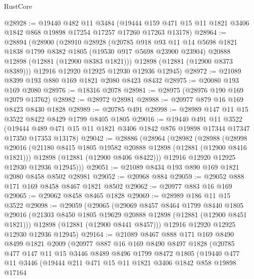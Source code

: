 \begin{lexlean}{RustCore}
\begin{coremodule}
@28928 := @19440
    @482
    @11
    @3484
    (@19444 @159 @471 @15 @11 @1821 @3406 @1842 @868 @19898 @17254 @17257 @17260 @17263 @13178)
@28964 := @28894
    (@28900
      (@28910
        @28928
        (@20785
          @918
          @93
          @11
          @14
          @5698
          @1821
          @1838
          @1799
          @8382
          @1805
          (@19530 @917 @5698 @23900 @23904)
          @20888
          @12898
          (@12881 (@12900 @8383 @1821)))
        @12898
        (@12881 (@12900 @8373 @8389)))
      @12916
      @12920
      @12925
      @12930
      @12936
      @12945)
@28972 := @21089 @8399 @193 @880 @169 @1821 @2080 @8423 @8432
@28975 := @20080 @193 @169 @2080
@28976 := @18316 @2078
@28981 := @28975 (@28976 @190 @169 @2079 @13762)
@28982 := @28972 @28981
@28988 := @20977 @879 @16 @169 @8423 @8430 @1828
@28989 := @20785 @491
@28998 := @28989 @147 @11 @15 @3522 @8422 @8429 @1799 @8405 @1805
@29016 := @19440
    @491
    @11
    @3522
    (@19444 @489 @471 @15 @11 @1821 @3406 @1842 @876 @19898 @17344 @17347 @17350 @17353 @13178)
@29042 := @28886
    (@28964
      (@28982
        (@28988
          (@28998
            @29016
            (@21180 @8415 @1805 @19582 @20888 @12898 (@12881 (@12900 @8416 @1821)))
            @12898
            (@12881 (@12900 @8406 @8422)))
          @12916
          @12920
          @12925
          @12930
          @12936
          @12945)))
@29051 := @21089 @8434 @193 @890 @169 @1821 @2080 @8458 @8502 @28981
@29052 := @20968 @884
@29059 := @29052 @888 @171 @169 @8458 @8467 @1821 @8502
@29062 := @20977 @883 @16 @169
@29065 := @29062 @8458 @8465 @1828
@29069 := @28989 @186 @11 @15 @3522
@29098 := @29059
    (@29065
      (@29069
        @8457
        @8464
        @1799
        @8440
        @1805
        @29016
        (@21303 @8450 @1805 @19629 @20888 @12898 (@12881 (@12900 @8451 @1821)))
        @12898
        (@12881 (@12900 @8441 @8457)))
      @12916
      @12920
      @12925
      @12930
      @12936
      @12945)
@29164 := @21089
    @8467
    @888
    @171
    @169
    @8490
    @8499
    @1821
    @2009
    (@20977
      @887
      @16
      @169
      @8490
      @8497
      @1828
      (@20785
        @477
        @147
        @11
        @15
        @3446
        @8489
        @8496
        @1799
        @8472
        @1805
        (@19440
          @477
          @11
          @3446
          (@19444
            @211
            @471
            @15
            @11
            @1821
            @3406
            @1842
            @858
            @19898
            @17164

\end{coremodule}
\end{lexlean}

